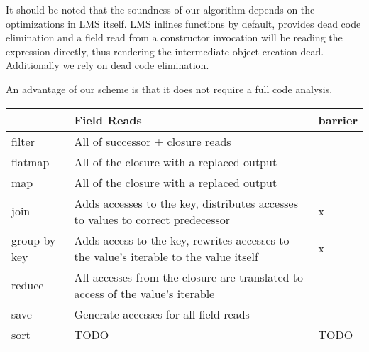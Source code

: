 \bigskip

It should be noted that the soundness of our algorithm depends on the optimizations in LMS itself. LMS inlines functions
by default, provides dead code elimination and a field read from a constructor invocation will be reading the
expression directly, thus rendering the intermediate object creation dead. Additionally we rely on dead code
elimination. 

An advantage of our scheme is that it does not require a full code analysis.

\todo{}

\begin{table}
    \begin{tabular}{l|l|l}
    
        ~            & Field Reads                                                                           & barrier \\ \hline
        filter       & All of successor + closure reads                                                      & ~       \\ 
        flatmap      & All of the closure with a replaced output                                             & ~       \\ 
        map          & All of the closure with a replaced output                                             & ~       \\ 
        join         & Adds accesses to the key, distributes accesses to values to correct predecessor       & x       \\ 
        group by key & Adds access to the key, rewrites accesses to the value's iterable to the value itself & x       \\ 
        reduce       & All accesses from the closure are translated to access of the value's iterable        & ~       \\ 
        save         & Generate accesses for all field reads                                                 & ~       \\ 
        sort         & TODO                                                                                  & TODO    \\ 


    \end{tabular}
\end{table}

\label{sec:field-reduction}
